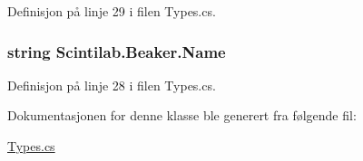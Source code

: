 Definisjon på linje 29 i filen Types.\+cs.

\hypertarget{class_scintilab_1_1_beaker_acb97eb3b7c1a9448162a6f526152713c}{
\subsubsection[{Name}]{\setlength{\rightskip}{0pt plus 5cm}string Scintilab.\+Beaker.\+Name}}\label{class_scintilab_1_1_beaker_acb97eb3b7c1a9448162a6f526152713c}


Definisjon på linje 28 i filen Types.\+cs.



Dokumentasjonen for denne klasse ble generert fra følgende fil\+:\begin{DoxyCompactItemize}
\item 
\hyperlink{_types_8cs}{Types.\+cs}\end{DoxyCompactItemize}
